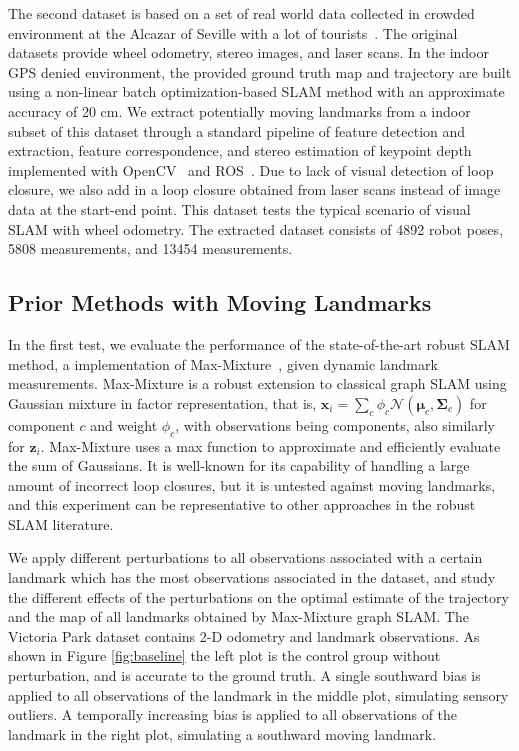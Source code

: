 The second dataset is based on a set of real world data collected in crowded
environment at the Alcazar of Seville with a lot of tourists~\cite{iros14-frog}.
The original datasets provide wheel odometry, stereo images, and laser scans.
In the indoor GPS denied environment, the provided ground truth map and
trajectory are built using a non-linear batch optimization-based SLAM method
with an approximate accuracy of 20 cm. We extract potentially moving landmarks
from a indoor subset of this dataset through a standard pipeline of feature
detection and extraction, feature correspondence, and stereo estimation of
keypoint depth implemented with OpenCV~\cite{opencv} and ROS~\cite{ros}.%
Due to lack of visual detection of loop closure, we also add
in a loop closure obtained from laser scans instead of image data at the
start-end point. This dataset tests the typical scenario of visual SLAM with
wheel odometry. The extracted dataset consists of 4892 robot poses, 5808
measurements, and 13454 measurements.

\subsection{Prior Methods with Moving Landmarks}

In the first test, we evaluate the performance of the state-of-the-art robust
SLAM method, a implementation of Max-Mixture~\cite{mm}, given dynamic landmark measurements.
Max-Mixture is a robust extension to classical graph SLAM using Gaussian
mixture in factor representation, that is, $ \boldsymbol{x}_i = \sum_c \phi_c
\mathcal{N}(\boldsymbol{\mu}_c, \boldsymbol{\Sigma}_c)$ for component $c$ and weight $\phi_c$, with
observations being components, also similarly for $\boldsymbol{z}_i$. Max-Mixture uses a max
function to approximate and efficiently evaluate the sum of Gaussians. It is
well-known for its capability of handling a large amount of incorrect loop
closures, but it is untested against moving landmarks, and this experiment can
be representative to other approaches in the robust SLAM literature. 

We apply different perturbations to all observations associated with a certain
landmark which has the most observations associated in the dataset, and study
the different effects of the perturbations on the optimal estimate of the
trajectory and the map of all landmarks obtained by Max-Mixture graph SLAM. The
Victoria Park dataset contains 2-D odometry and landmark observations. As shown
in Figure \ref{fig:baseline} the left plot is the control group without
perturbation, and is accurate to the ground truth. A single southward bias is
applied to all observations of the landmark in the middle plot, simulating
sensory outliers. A temporally increasing bias is applied to all observations
of the landmark in the right plot, simulating a southward moving landmark.

